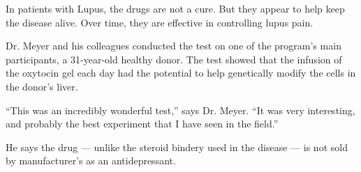\documentclass{article}
\begin{document}
In patients with Lupus, the drugs are not a cure. But they appear to help keep the disease alive. Over time, they are effective in controlling lupus pain.

Dr. Meyer and his colleagues conducted the test on one of the program’s main participants, a 31-year-old healthy donor. The test showed that the infusion of the oxytocin gel each day had the potential to help genetically modify the cells in the donor’s liver.

“This was an incredibly wonderful test,” says Dr. Meyer. “It was very interesting, and probably the best experiment that I have seen in the field.”

He says the drug — unlike the steroid bindery used in the disease — is not sold by manufacturer’s as an antidepressant.
\end{document}
